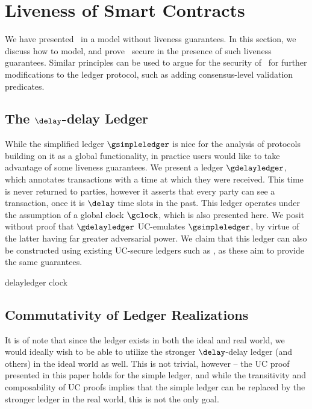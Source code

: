 \section{Liveness of Smart Contracts}
\label{sec:liveness}

We have presented \kachina\ in a model without liveness guarantees. In this
section, we discuss how to model, and prove \kachina\ secure in the presence of
such liveness guarantees. Similar principles can be used to argue for the
security of \kachina\ for further modifications to the ledger protocol, such as
adding consensus-level validation predicates.

\subsection{The \texorpdfstring{$\delay$}{δ}-delay Ledger}

While the simplified ledger $\gsimpleledger$ is nice for the analysis of
protocols building on it as a global functionality, in practice users would like
to take advantage of some liveness guarantees. We present a ledger
$\gdelayledger$, which annotates transactions with a time at which they were
received. This time is never returned to parties, however it asserts that every
party can see a transaction, once it is $\delay$ time slots in the past. This
ledger operates under the assumption of a global clock $\gclock$, which is also
presented here. We posit without proof that $\gdelayledger$ UC-emulates
$\gsimpleledger$, by virtue of the latter having far greater adversarial power.
We claim that this ledger can also be constructed using existing UC-secure ledgers
such as \cite{C:BMTZ17,CCS:BGKRZ18}, as these aim to provide the same
guarantees.

{delayledger}
{clock}

\subsection{Commutativity of Ledger Realizations}
\label{sec:commuc}

It is of note that since the ledger exists in both the ideal and real world, we
would ideally wish to be able to utilize the stronger $\delay$-delay ledger (and
others) in the ideal world as well. This is not trivial, however -- the UC proof
presented in this paper holds for the simple ledger, and while the transitivity
and composability of UC proofs implies that the simple ledger can be replaced by
the stronger ledger in the real world, this is not the only goal.

